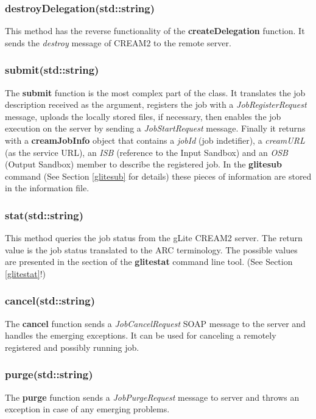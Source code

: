 \documentclass{article}
\begin{document}
\subsubsection*{destroyDelegation(std::string)}
This method has the reverse functionality of the \textbf{createDelegation} function. It sends the \textit{destroy} message of CREAM2 to the remote server.
\subsubsection*{submit(std::string)}
The \textbf{submit} function is the most complex part of the class. It translates the job description received as the argument, registers the job with a \textit{JobRegisterRequest} message, uploads the locally stored files, if necessary, then enables the job execution on the server by sending a \textit{JobStartRequest} message. Finally it returns with a \textbf{creamJobInfo} object that contains a \textit{jobId} (job indetifier), a \textit{creamURL} (as the service URL), an \textit{ISB} (reference to the Input Sandbox) and an \textit{OSB} (Output Sandbox) member to describe the registered job. In the \textbf{glitesub} command (See Section \ref{glitesub} for details) these pieces of information are stored in the information file.
\subsubsection*{stat(std::string)}
This method queries the job status from the gLite CREAM2 server. The return value is the job status translated to the ARC terminology. The possible values are presented in the section of the \textbf{glitestat} command line tool. (See Section \ref{glitestat}!)
\subsubsection*{cancel(std::string)}
The \textbf{cancel} function sends a \textit{JobCancelRequest} SOAP message to the server and handles the emerging exceptions. It can be used for canceling a remotely registered and possibly running job.
\subsubsection*{purge(std::string)}
The \textbf{purge} function sends a \textit{JobPurgeRequest} message to server and throws an exception in case of any emerging problems.
\end{document}
